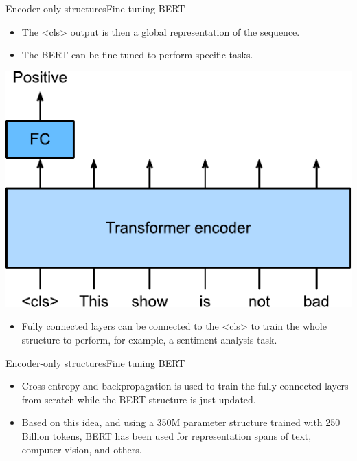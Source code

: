 \documentclass{beamer}
\begin{document}
\begin{frame}{Encoder-only structures}{Fine tuning BERT}
\begin{itemize}
\item The <cls> output is then a global representation of the sequence. 
    \item The BERT can be fine-tuned to perform specific tasks.
\end{itemize}
    \begin{center}
        \includegraphics[scale=0.5]{Module 6 (Attention-based networks)/pics/bert-finetune-classification.pdf}
    \end{center}
\begin{itemize}
    \item Fully connected layers can be connected to the <cls> to train the whole structure to perform, for example, a sentiment analysis task.
    
\end{itemize}
\end{frame}
\begin{frame}{Encoder-only structures}{Fine tuning BERT}
\begin{itemize}
\item Cross entropy and backpropagation is used to train the fully connected layers from scratch while the BERT structure is just updated.  

    \item Based on this idea, and using a 350M parameter structure trained with 250 Billion tokens, BERT has been used for representation spans of text, computer vision, and others. 
\end{itemize}
\end{frame}
\end{document}

